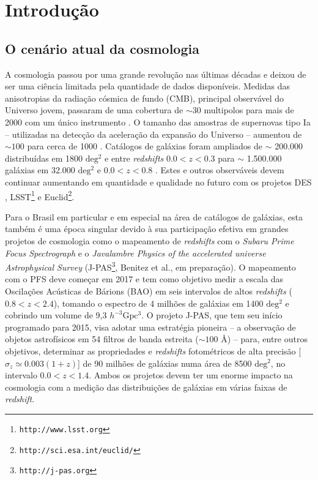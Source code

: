\documentclass[12pt,a4paper]{article}
\begin{document}
\section{Introdução}

\subsection{O cenário atual da cosmologia}

A cosmologia passou por uma grande revolução nas últimas décadas e deixou de ser 
uma ciência limitada pela quantidade de dados disponíveis. Medidas das 
anisotropias da radiação cósmica de fundo (CMB), principal observável do Universo 
jovem, passaram de uma cobertura de $\sim 30$ multipolos \citep{Tegmark96x} para 
mais de 2000 com um único instrumento \citep{Planck13ax}. O tamanho das amostras 
de supernovas tipo Ia -- utilizadas na detecção da aceleração da expansão do Universo 
-- aumentou de $\sim 100$ \citep{Perlmutter98x,Riess98x} para cerca de 1000 
\citep{Conley11x,Campbell13x}. Catálogos de galáxias foram ampliados de $\sim$ 200.000 
distribuídas em 1800 $\mathrm{deg^2}$ e entre \emph{redshifts} $0.0<z<0.3$ \citep{Cole05x} 
para $\sim$ 1.500.000 galáxias em 32.000 $\mathrm{deg^2}$ e $0.0<z<0.8$ \citep{Ahn12x}. 
Estes e outros observáveis devem continuar aumentando em quantidade e qualidade no futuro 
com os projetos DES \citep{DES05x}, LSST\footnote{\texttt{http://www.lsst.org}} \citep{LSST09x} e 
Euclid\footnote{\texttt{http://sci.esa.int/euclid/}}. 

Para o Brasil em particular e em especial na área de catálogos de galáxias, 
esta também é uma época singular devido à sua participação 
efetiva em grandes projetos de cosmologia como o mapeamento de \emph{redshifts} com o 
\emph{Subaru Prime Focus Spectrograph} \citep[PFS\footnote{\texttt{http://sumire.ipmu.jp/en/2652}},][]{Takada12x} 
e o \emph{Javalambre Physics of the accelerated universe Astrophysical Survey} 
(J-PAS\footnote{\texttt{http://j-pas.org}}, Benitez et al., em preparação). 
O mapeamento com o PFS deve começar em 2017 e tem como objetivo medir a escala das 
Oscilações Acústicas de Bárions (BAO) em seis intervalos de altos \emph{redshifts} 
($0.8<z<2.4$), tomando o espectro de 4 milhões de galáxias em 1400 $\mathrm{deg^2}$ e 
cobrindo um volume de  9,3 $h^{-3}\mathrm{Gpc^3}$. 
O projeto J-PAS, que tem seu início programado para 2015, visa adotar uma estratégia 
pioneira -- a observação de objetos astrofísicos em 54 filtros de banda estreita 
($\sim100$ \AA) -- para, entre outros objetivos, determinar as propriedades e 
\emph{redshifts} fotométricos de alta precisão [$\sigma_z\simeq0.003(1+z)$] de 90 
milhões de galáxias numa área de 8500 $\mathrm{deg^2}$, no intervalo $0.0<z<1.4$. 
Ambos os projetos devem ter um enorme impacto na cosmologia com a medição das 
distribuições de galáxias em várias faixas de \emph{redshift}.
\end{document}
